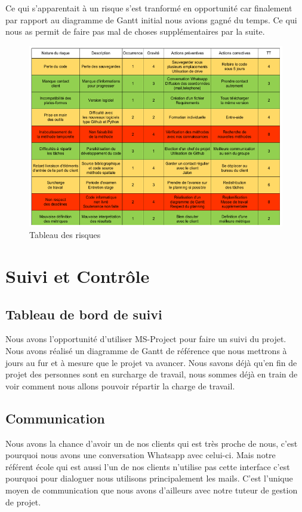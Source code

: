 \documentclass[a4paper,12pt]{report}
\theoremstyle{break}
\begin{document}
 Ce qui s'apparentait à un risque s'est tranformé en opportunité car finalement par rapport au diagramme de Gantt initial nous avions gagné du temps. Ce qui nous as permit de faire pas mal de choses supplémentaires par la suite.

\begin{figure}[h] 
     \centering
       \includegraphics[width=\textwidth]{images/matrice.png}
       \caption{Tableau des risques}
       \label{Tab risque}
  \end{figure}
    
\chapter{Suivi et Contrôle}
\section{Tableau de bord de suivi}
    Nous avons l’opportunité d’utiliser MS-Project pour faire un suivi du projet. Nous avons réalisé un diagramme de Gantt de référence que nous mettrons à jours au fur et à mesure que le projet va avancer. Nous savons déjà qu’en fin de projet des personnes sont en surcharge de travail, nous sommes déjà en train de voir comment nous allons pouvoir répartir la charge de travail. 

\section{Communication }

    Nous avons la chance d’avoir un de nos clients qui est très proche de nous, c’est pourquoi nous avons une conversation Whatsapp avec celui-ci. Mais notre référent école qui est aussi l’un de nos clients n’utilise pas cette interface c’est pourquoi pour dialoguer nous utilisons principalement les mails. C’est l’unique moyen de communication que nous avons d’ailleurs avec notre tuteur de gestion de projet. 
    
\end{document}
